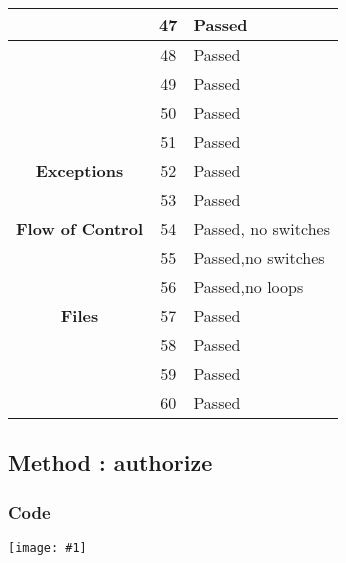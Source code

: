 \documentclass[11pt, a4paper,titlepage]{article}
\newcommand{\image}[1]{
	\begin{center}
		\noindent \texttt{[image: \#1]}
	\end{center}
	}
\begin{document}
\begin{tabularx}{\textwidth}{| c |c |X |}
	\hline  & 47 & Passed \\
	\hline  & 48 & Passed \\
	\hline  & 49 & Passed \\
	\hline  & 50 & Passed \\
	\hline  & 51 & Passed \\
	\hline \textbf{Exceptions} & 52 & Passed \\
	\hline  & 53 & Passed \\
	\hline \textbf{Flow of Control} & 54 & Passed, no switches \\
	\hline  & 55 & Passed,no switches \\
	\hline  & 56 & Passed,no loops \\
	\hline \textbf{Files} & 57 & Passed \\
	\hline  & 58 & Passed \\
	\hline  & 59 & Passed \\
	\hline  & 60 & Passed \\
	\hline
\end{tabularx}


\newpage
\subsection{Method : authorize }
\subsubsection{Code}
\image{code_2.png}
\newpage
\end{document}
